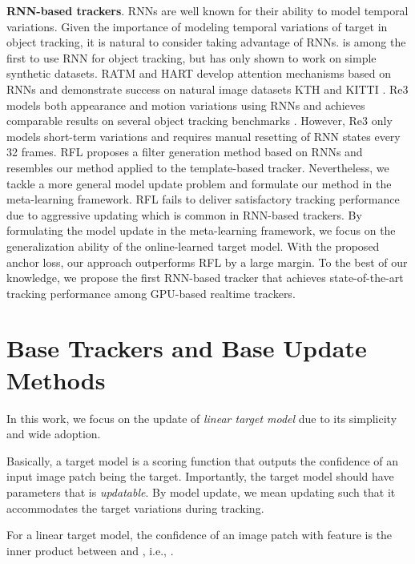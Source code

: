 \documentclass[journal]{IEEEtran}
\begin{document}
\textbf{RNN-based trackers}.
RNNs are well known for their ability to model temporal variations. Given the importance of modeling temporal variations of target in object tracking, it is natural to consider taking advantage of RNNs. \cite{gan2015first} is among the first to use RNN for object tracking, but has only shown to work on simple synthetic datasets. RATM \cite{kahou2015ratm} and HART \cite{Kosiorek2017HierarchicalAR} develop attention mechanisms based on RNNs and demonstrate success on natural image datasets KTH \cite{Schldt2004RecognizingHA} and KITTI \cite{Geiger2013VisionMR}. Re3 \cite{gordon2017re3} models both appearance and motion variations using RNNs and achieves comparable results on several object tracking benchmarks \cite{Kristan2014TheVO, Kristan2016TheVO, wu2013online}. However, Re3 \cite{gordon2017re3} only models short-term variations and requires manual resetting of RNN states every 32 frames. RFL \cite{yang2017recurrent} proposes a filter generation method based on RNNs and resembles our method applied to the template-based tracker. Nevertheless, we tackle a more general model update problem and formulate our method in the meta-learning framework. RFL fails to deliver satisfactory tracking performance due to aggressive updating which is common in RNN-based trackers. By formulating the model update in the meta-learning framework, we focus on the generalization ability of the online-learned target model. With the proposed anchor loss, our approach outperforms RFL by a large margin. To the best of our knowledge, we propose the first RNN-based tracker that achieves state-of-the-art tracking performance among GPU-based realtime trackers.

\section{Base Trackers and Base Update Methods} \label{sec:base-tracker-base-update-method}
In this work, we focus on the update of \emph{linear target model} due to its simplicity and wide adoption.  

Basically, a target model is a scoring function that outputs the confidence of an input image patch being the target. Importantly, the target model should have parameters  that is \emph{updatable}. By model update, we mean updating  such that it accommodates the target variations during tracking.
 
For a linear target model, the confidence  of an image patch with feature  is the inner product between  and , i.e., .
\end{document}
